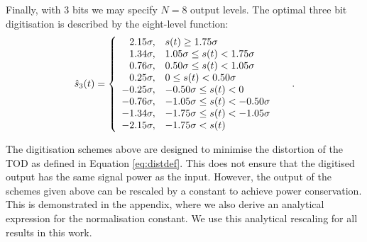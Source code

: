 \documentclass[a4paper,fleqn,usenatbib]{mnras}
\begin{document}
Finally, with 3 bits we may specify $N=8$ output levels. The optimal three bit digitisation is described by the eight-level function:
\begin{equation}  \label{eq:3bit}
\hat{s}_3(t) = \left\{ \begin{array}{rl}
2.15 \sigma, & s(t) \geq 1.75 \sigma\\
1.34 \sigma, & 1.05 \sigma \leq s(t) < 1.75 \sigma\\
0.76 \sigma, & 0.50 \sigma \leq s(t) < 1.05 \sigma\\
0.25 \sigma, & 0 \leq s(t) < 0.50 \sigma\\
-0.25 \sigma, & -0.50 \sigma \leq s(t) < 0\\
-0.76 \sigma, & -1.05 \sigma \leq s(t) < -0.50 \sigma\\
-1.34 \sigma, & -1.75 \sigma \leq s(t) < -1.05 \sigma\\
-2.15 \sigma, & -1.75 \sigma < s(t)\\
\end{array} \right. \hspace{0.5cm}.  \end{equation}

The digitisation schemes above are designed to minimise the distortion of the TOD as defined in Equation \ref{eq:distdef}. This does not ensure that the digitised output has the same signal power as the input. However, the output of the schemes given above can be rescaled by a constant to achieve power conservation. This is demonstrated in the appendix, where we also derive an analytical expression for the normalisation constant. We use this analytical rescaling for all results in this work.



\end{document}
